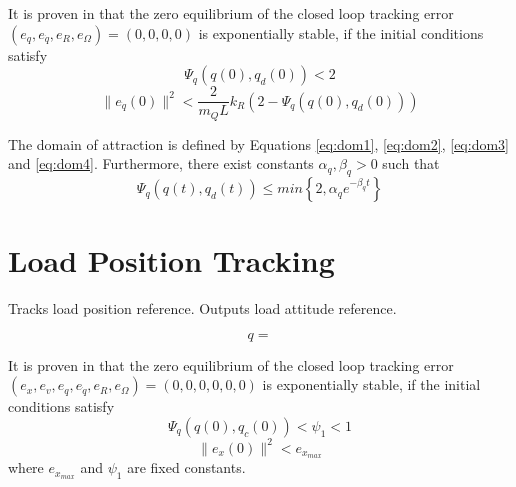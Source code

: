 It is proven in \cite{Sreenath2013c} that the zero equilibrium of the closed loop tracking error $ (e_q,e_{\dot{q}},e_R,e_\Omega)=(0,0,0,0) $ is exponentially stable, if the initial conditions satisfy
\begin{equation}\label{eq:dom3}
\Psi_q(q(0),q_d(0))<2
\end{equation}
\begin{equation}\label{eq:dom4}
\parallel e_{\dot{q}}(0)\parallel^2<\frac{2}{m_QL}{k_R}(2-\Psi_q(q(0),q_d(0)))
\end{equation}

The domain of attraction is defined by Equations \ref{eq:dom1}, \ref{eq:dom2}, \ref{eq:dom3} and \ref{eq:dom4}.
Furthermore, there exist constants $ \alpha_q,\beta_q>0 $ such that
\begin{equation}\label{eq:con.Psiqconv}
\Psi_q(q(t),q_d(t)) \leq min\left\lbrace 2,\alpha_qe^{-\beta_qt}\right\rbrace 
\end{equation}

\section{Load Position Tracking}


Tracks load position reference. Outputs load attitude reference.

\begin{equation}\label{eq:con.q}
q =
\end{equation}


It is proven in \cite{Sreenath2013c} that the zero equilibrium of the closed loop tracking error $ (e_x,e_v,e_q,e_{\dot{q}},e_R,e_\Omega)=(0,0,0,0,0,0) $ is exponentially stable, if the initial conditions satisfy
\begin{equation}\label{eq:dom5}
\Psi_q(q(0),q_c(0))<\psi_1<1
\end{equation}
\begin{equation}
\parallel e_{x}(0)\parallel^2<e_{x_{max}}
\end{equation}
where $ e_{x_{max}} $ and $ \psi_1 $ are fixed constants. 

